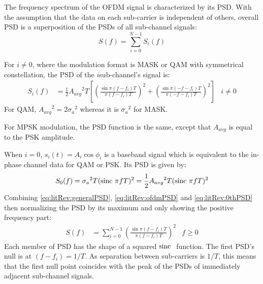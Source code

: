 The frequency spectrum of the \gls{OFDM} signal is characterized by its \gls{PSD}. With the assumption that the data on each sub-carrier is independent of others, overall \gls{PSD} is a superposition of the PSDs of all sub-channel signals\cite{fuqin}:
\begin{equation}
	S(f) = \sum_{i=0}^{N-1}S_i(f)
	\label{eq:litRev:generalPSD}
\end{equation}
\begin{mathDef}
\end{mathDef}
For \(i \neq 0\), where the modulation format is \gls{MASK} or \gls{QAM} with symmetrical constellation, the PSD of the \(i\)\nth sub-channel's signal is:
\begin{align}
	S_i(f) &= \frac{1}{2}{A_{avg}}^2T \left[ \left(\frac{\sin \pi(f-f_i)T}{\pi(f-f_i)T}\right)^2 + \left(\frac{\sin \pi(-f -f_i)T}{\pi(-f-f_i)T}\right)^2\right] & i\neq 0
	\label{eq:litRev:ofdmPSD}
\end{align}
For QAM, \({A_{avg}}^2 = 2{\sigma_a}^2\) whereas it is \({\sigma_a}^2\) for \gls{MASK}.
\begin{mathDef}
\end{mathDef}
For \gls{MPSK} modulation, the PSD function is the same, except that \(A_{avg}\) is equal to the \gls{PSK} amplitude.

When \(i=0\), \(s_i(t) = A_i \cos \phi_i\) is a baseband signal which is equivalent to the in-phase channel data for \gls{QAM} or \gls{PSK}. Its \gls{PSD} is given by:
\begin{equation}
	S_0(f) = {\sigma_a}^2T (\text{sinc~} \pi f T)^2 = \frac{1}{2}{A_{avg}}^2T(\text{sinc~} \pi f T)^2
	\label{eq:litRev:0thPSD}
\end{equation}
Combining \eqref{eq:litRev:generalPSD}, \eqref{eq:litRev:ofdmPSD} and \eqref{eq:litRev:0thPSD} then normalizing the PSD by its maximum and only showing the positive frequency part:
\begin{align}
	S(f) &= \sum_{i=0}^{N-1} \left( \frac{\sin \pi(f - f_i)T}{\pi(f - f_i)T} \right)^2 & f \geq 0
	\label{eq:litRev:simplePSD}
\end{align}
Each member of PSD has the shape of a squared \(\text{sinc~}\) function. The first PSD's null is at \((f-f_i) = 1/T\). As separation between sub-carriers is \(1/T\), this means that the first null point coincides with the peak of the PSDs of immediately adjacent sub-channel signals.

